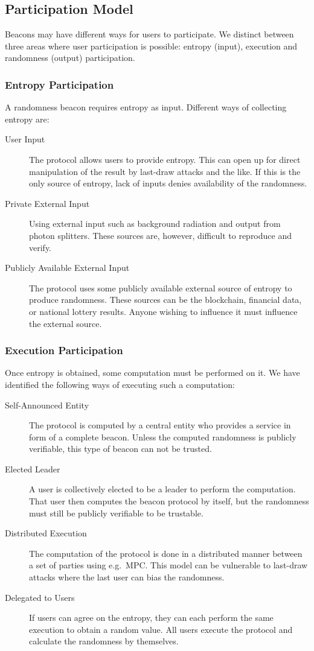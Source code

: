 \subsection{Participation Model}
\label{sub:participation_model}
Beacons may have different ways for users to participate. We distinct between three areas where user participation is possible: entropy (input), execution and randomness (output) participation.

\subsubsection{Entropy Participation}
A randomness beacon requires entropy as input. Different ways of collecting entropy are:
   
\begin{description}
    \item [User Input] The protocol allows users to provide entropy. This can open up for direct manipulation of the result by last-draw attacks and the like. If this is the only source of entropy, lack of inputs denies availability of the randomness.
    \item [Private External Input] Using external input such as background radiation and output from photon splitters. These sources are, however, difficult to reproduce and verify.
    \item [Publicly Available External Input] The protocol uses some publicly available external source of entropy to produce randomness. These sources can be the blockchain, financial data, or national lottery results. Anyone wishing to influence it must influence the external source. 
\end{description}

\subsubsection{Execution Participation}
Once entropy is obtained, some computation must be performed on it. We have identified the following ways of executing such a computation:

\begin{description}
    \item[Self-Announced Entity] The protocol is computed by a central entity who provides a service in form of a complete beacon. Unless the computed randomness is publicly verifiable, this type of beacon can not be trusted. 
    \item[Elected Leader] A user is collectively elected to be a leader to perform the computation. That user then computes the beacon protocol by itself, but the randomness must still be publicly verifiable to be trustable. 
    \item[Distributed Execution]
    The computation of the protocol is done in a distributed manner between a set of parties using e.g.\ MPC\@. This model can be vulnerable to last-draw attacks where the last user can bias the randomness. 
    \item[Delegated to Users] If users can agree on the entropy, they can each perform the same execution to obtain a random value. All users execute the protocol and calculate the randomness by themselves. 
\end{description}

